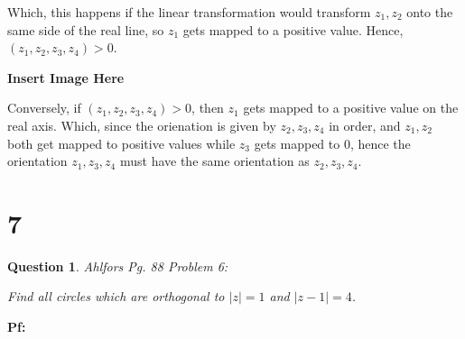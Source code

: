 \documentclass{article}
\newtheorem{question}{Question}
\begin{document}
Which, this happens if the linear transformation would transform $z_1,z_2$ onto the same side of the real line, so $z_1$ gets mapped to a positive value.
Hence, $(z_1,z_2,z_3,z_4)>0$.

\textbf{Insert Image Here}

\hfill

Conversely, if $(z_1,z_2,z_3,z_4)>0$, then $z_1$ gets mapped to a positive value on the real axis.
Which, since the orienation is given by $z_2,z_3,z_4$ in order, and $z_1,z_2$ both get mapped to positive values while $z_3$ gets mapped to $0$,
hence the orientation $z_1,z_3,z_4$ must have the same orientation as $z_2,z_3,z_4$.

\break

\section*{7}
\begin{myBox}[]{}
    \begin{question}
       Ahlfors Pg. 88 Problem 6:

       Find all circles which are orthogonal to $|z|=1$ and $|z-1|=4$.
    \end{question}
\end{myBox}

\textbf{Pf:}
\end{document}
